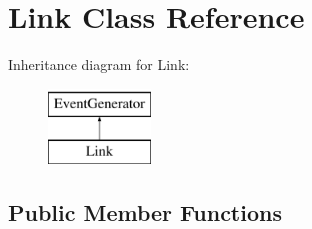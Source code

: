 \hypertarget{classLink}{\section{\-Link \-Class \-Reference}
\label{classLink}
}
\-Inheritance diagram for \-Link\-:\begin{figure}[H]
\begin{center}
\leavevmode
\includegraphics[height=2.000000cm]{classLink}
\end{center}
\end{figure}
\subsection*{\-Public \-Member \-Functions}
